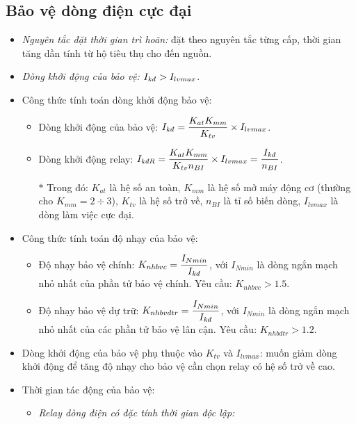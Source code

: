 \documentclass[12pt,a4paper]{article}
\begin{document}
\subsection{Bảo vệ dòng điện cực đại}
	\begin{itemize}
		\item \emph{Nguyên tắc đặt thời gian trì hoãn:} đặt theo nguyên tắc từng cấp, thời gian tăng dần tính từ hộ tiêu thụ cho đến nguồn.
		
		\item \emph{Dòng khởi động của bảo vệ:} $I_{\text{\textit{kđ}}} > I_{lvmax}$.
		
		\item Công thức tính toán dòng khởi động bảo vệ:
			\begin{itemize}
				\item Dòng khởi động của bảo vệ: $I_{\text{\textit{kđ}}} = \dfrac{K_{at} K_{mm}}{K_{tv}} \times I_{lvmax}$.
				
				\item Dòng khởi động relay: $I_{\text{\textit{kđR}}} = \dfrac{K_{at} K_{mm}}{K_{tv} n_{BI}} \times I_{lvmax} = \dfrac{I_{\text{\textit{kđ}}}}{n_{BI}}$.
				
				\item[$\ast$] Trong đó: $K_{at}$ là hệ số an toàn, $K_{mm}$ là hệ số mở máy động cơ (thường cho $K_{mm} = 2 \div 3$), $K_{tv}$ là hệ số trở về, $n_{BI}$ là tỉ số biến dòng, $I_{lvmax}$ là dòng làm việc cực đại.
			\end{itemize}
				
		\item Công thức tính toán độ nhạy của bảo vệ:
			\begin{itemize}
				\item Độ nhạy bảo vệ chính: $K_{nhbvc} = \dfrac{I_{Nmin}}{I_{\text{\textit{kđ}}}}$, với $I_{Nmin}$ là dòng ngắn mạch nhỏ nhất của phần tử bảo vệ chính. Yêu cầu: $K_{nhbvc} > 1.5$.
				
				\item Độ nhạy bảo vệ dự trữ: $K_{nhbvdtr} = \dfrac{I_{Nmin}}{I_{\text{\textit{kđ}}}}$, với $I_{Nmin}$ là dòng ngắn mạch nhỏ nhất của các phần tử bảo vệ lân cận. Yêu cầu: $K_{nhbdtr} > 1.2$.
			\end{itemize}
			
		\item Dòng khởi động của bảo vệ phụ thuộc vào $K_{tv}$ và $I_{lvmax}$: muốn giảm dòng khởi động để tăng độ nhạy cho bảo vệ cần chọn relay có hệ số trở về cao.
		
		\item Thời gian tác động của bảo vệ:
			\begin{itemize}
				\item \emph{Relay dòng điện có đặc tính thời gian độc lập:}
\end{itemize}
\end{itemize}
\end{document}
